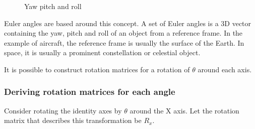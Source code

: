 \documentclass[12pt, a4paper]{article}
\begin{document}
\begin{figure}[H]
    \centering
    \caption{Yaw pitch and roll}
    \label{yawpitchroll}
\end{figure}

Euler angles are based around this concept. A set of Euler angles is a 3D vector
containing the yaw, pitch and roll of an object from a reference frame. In the
example of aircraft, the reference frame is usually the surface of the Earth. In
space, it is usually a prominent constellation or celestial object.

It is possible to construct rotation matrices for a rotation of $\theta$ around
each axis.

\subsubsection{Deriving rotation matrices for each angle}
Consider rotating the identity axes by $\theta$ around the X axis. Let the
rotation matrix that describes this transformation be $R_x$. \\
\end{document}
